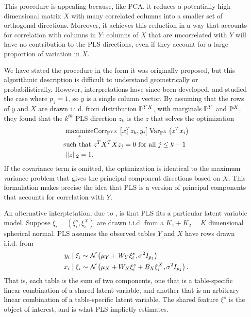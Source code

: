 \documentclass[utf8]{frontiersFPHY} %
\begin{document}
This procedure is appealing because, like PCA, it reduces a potentially
high-dimensional matrix $X$ with many correlated columns into a smaller set of
orthogonal directions. Moreover, it achieves this reduction in a way that
accounts for correlation with columns in $Y$: columns of $X$ that are
uncorrelated with $Y$ will have no contribution to the PLS directions, even if
they account for a large proportion of variation in $X$.

We have stated the procedure in the form it was originally proposed, but this
algorithmic description is difficult to understand geometrically or
probabilistically. However, interpretations have since been developed.
\cite{frank1993statistical} and \cite{stone1990continuum} studied the case where
$p_{1} = 1$, so $y$ is a single column vector. By assuming that the rows of $y$
and $X$ are drawn i.i.d. from distribution $\P^{YX}$, with marginals $\P^{Y}$
and $\P^{X}$, they found that the $k^{th}$ PLS direction $z_{k}$ is the $z$ that
solves the optimization
\begin{align}
  \label{eq:pls_obj}
\maximize_{z} & \Corrsubarg{\P^{YX}}{x_{i}^{T}z_{k},
  y_{i}}\Varsubarg{\P^{X}}{z^{T}x_i} \\ \text{such that }&z^{T}X^{T}X z_{j} = 0
\text{ for all }j \nonumber \leq k - 1 \nonumber \\ \|z\|_2 = 1. \nonumber
\end{align}
If the covariance term is omitted, the optimization is identical to the maximum
variance problem that gives the principal component directions based on $X$.
This formulation makes precise the idea that PLS is a version of principal
components that accounts for correlation with $Y$.

An alternative interptetation, due to \citep{gustafsson2001probabilistic}, is
that PLS fits a particular latent variable model. Suppose $\xi_{i} =
\left(\xi_{i}^{s}, \xi_{i}^{X}\right)$ are drawn i.i.d. from a $K_{1} + K_{2} =
K$ dimensional spherical normal. PLS assumes the observed tables $Y$ and $X$
have rows drawn i.i.d. from
\begin{align*}
y_{i} \mid \xi_{i} &\sim \Gsn\left(\mu_Y + W_{Y}\xi_{i}^{s},
\sigma^{2}I_{p_{1}}\right) \\ x_{i} \mid \xi_{i} &\sim \Gsn\left(\mu_{X} + W_{X}
\xi_{i}^{s} + B_{X}\xi_{i}^{X}, \sigma^{2}I_{p_{2}}\right).
\end{align*}
That is, each table is the sum of two components, one that is a table-specific
linear combination of a shared latent variable, and another that is an arbitrary
linear combination of a table-specific latent variable. The shared feature
$\xi^{s}$ is the object of interest, and is what PLS implictly estimates.
\end{document}
